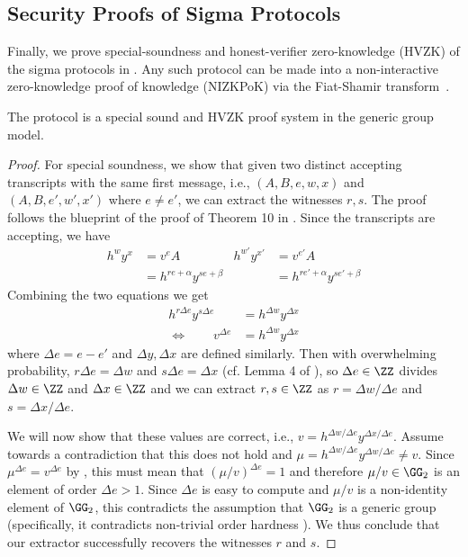 \subsection{Security Proofs of Sigma Protocols}
Finally, we prove special-soundness and honest-verifier zero-knowledge (HVZK) of the sigma protocols in . Any such protocol can be made into a non-interactive zero-knowledge proof of knowledge (NIZKPoK) via the Fiat-Shamir transform~\cite{C:FiaSha86}.

\begin{theorem}[\zkpoks]\label{thm:poks}
    The protocol \zkpoks is a special sound and HVZK proof system in the generic group model.
\end{theorem}
\begin{proof}
    For special soundness, we show that given two distinct accepting transcripts with the same first message, i.e., $(A, B, e, w, x)$ and $(A, B, e', w', x')$ where $e \neq e'$, we can extract the witnesses $r, s$. The proof follows the blueprint of the proof of Theorem 10 in \cite{C:BonBunFis19}. Since the transcripts are accepting, we have
    \begin{align*}
        h^w y^x &= v^e A               & h^{w'} y^{x'} &= v^{e'} A \\
                &= h^{r e + \alpha} y^{s e + \beta} &  &= h^{r e' + \alpha} y^{s e' + \beta}
    \end{align*}
    Combining the two equations we get 
    \begin{align}
         h^{r \Delta e} y^{s \Delta e} &= h^{\Delta w} y^{\Delta x} \nonumber \\
    \iff \hspace{2em} v^{\Delta e} &= h^{\Delta w} y^{\Delta x} \label{eq:combo}
    \end{align}
    where $\Delta e = e-e'$ and $\Delta y, \Delta x$ are defined similarly. 
    Then with overwhelming probability, $r \Delta e = \Delta w$ and $s \Delta e = \Delta x$ (cf. Lemma 4 of \cite{C:BonBunFis19}), so $\Delta e \in \ZZ$ divides $\Delta w \in \ZZ$ and $\Delta x \in \ZZ$ and we can extract $r,s \in \ZZ$ as $r = \Delta w / \Delta e$ and $s = \Delta x/\Delta e$.
    
    We will now show that these values are correct, i.e., $v = h^{\Delta w/\Delta e} y^{\Delta x/\Delta e}$. Assume towards a contradiction that this does not hold and $\mu = h^{\Delta w/\Delta e} y^{\Delta w/\Delta e}\allowbreak \neq v$. Since $\mu^{\Delta e} = v^{\Delta e}$ by , this must mean that $(\mu/v)^{\Delta e} = 1$ and therefore $\mu/v \in \GG_2$ is an element of order $\Delta e > 1$. Since $\Delta e$ is easy to compute and $\mu/v$ is a non-identity element of $\GG_2$, this contradicts the assumption that $\GG_2$ is a generic group (specifically, it contradicts non-trivial order hardness \cite[Corollary 2]{C:BonBunFis19}). We thus conclude that our extractor successfully recovers the witnesses $r$ and $s$.
    

\end{proof}

